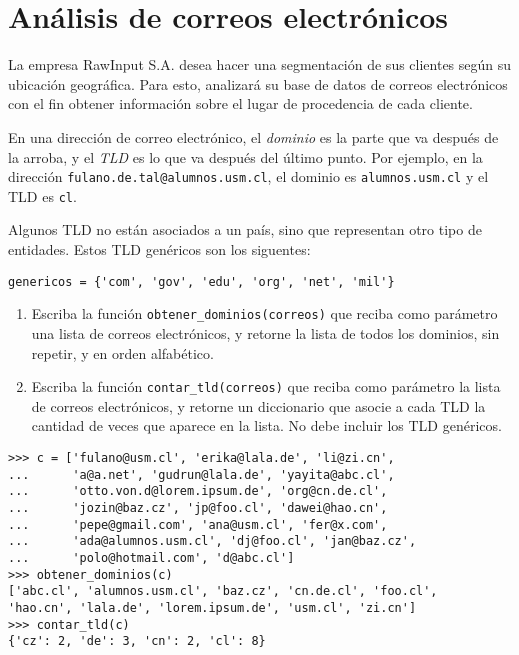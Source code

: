 \section{Análisis de correos electrónicos}

La empresa RawInput S.A. desea hacer una segmentación de sus clientes
según su ubicación geográfica. Para esto, analizará su base de datos de
correos electrónicos con el fin obtener información sobre el lugar de
procedencia de cada cliente.

En una dirección de correo electrónico, el \emph{dominio} es la parte
que va des\-pués de la arroba, y el \emph{TLD} es lo que va después del
último punto. Por ejemplo, en la dirección
\lstinline!fulano.de.tal@alumnos.usm.cl!, el dominio es
\lstinline!alumnos.usm.cl! y el TLD es \lstinline!cl!.

Algunos TLD no están asociados a un país, sino que representan otro tipo
de entidades. Estos TLD genéricos son los siguentes:
\begin{lstlisting}
genericos = {'com', 'gov', 'edu', 'org', 'net', 'mil'}
\end{lstlisting}

\begin{enumerate}
\item
  Escriba la función \lstinline!obtener_dominios(correos)! que reciba
  como parámetro una lista de correos electrónicos, y retorne la lista
  de todos los dominios, sin repetir, y en orden alfabético.
\item
  Escriba la función \lstinline!contar_tld(correos)! que reciba como
  parámetro la lista de correos electrónicos, y retorne un diccionario
  que asocie a cada TLD la cantidad de veces que aparece en la lista. No
  debe incluir los TLD genéricos.
\end{enumerate}

\begin{lstlisting}
>>> c = ['fulano@usm.cl', 'erika@lala.de', 'li@zi.cn',
...      'a@a.net', 'gudrun@lala.de', 'yayita@abc.cl',
...      'otto.von.d@lorem.ipsum.de', 'org@cn.de.cl',
...      'jozin@baz.cz', 'jp@foo.cl', 'dawei@hao.cn',
...      'pepe@gmail.com', 'ana@usm.cl', 'fer@x.com',
...      'ada@alumnos.usm.cl', 'dj@foo.cl', 'jan@baz.cz',
...      'polo@hotmail.com', 'd@abc.cl']
>>> obtener_dominios(c)
['abc.cl', 'alumnos.usm.cl', 'baz.cz', 'cn.de.cl', 'foo.cl',
'hao.cn', 'lala.de', 'lorem.ipsum.de', 'usm.cl', 'zi.cn']
>>> contar_tld(c)
{'cz': 2, 'de': 3, 'cn': 2, 'cl': 8}
\end{lstlisting}

